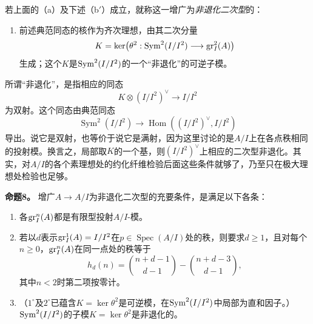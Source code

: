 若上面的（a）及下述（b$'$）成立，就称这一增广为\emph{非退化二次型}的：
\begin{enumerate}
\item[(b$'$)] 前述典范同态的核作为齐次理想，由其二次分量
\[
K=\ker\bigl(\theta^2:\operatorname{Sym}^2(I/I^2)\longrightarrow\operatorname{gr}_I^2(A)\bigr)
\]
生成；这个$K$是$\operatorname{Sym}^2(I/I^2)$的一个“非退化”的可逆子模。
\end{enumerate}
所谓“非退化”，是指相应的同态
\[
K\otimes (I/I^2)^\vee\longrightarrow I/I^2
\]
为双射。这个同态由典范同态
\[
\operatorname{Sym}^2(I/I^2)\longrightarrow
\operatorname{Hom}((I/I^2)^\vee,I/I^2)
\]
导出。说它是双射，也等价于说它是满射，因为这里讨论的是$A/I$上在各点秩相同的投射模。换言之，局部取$K$的一个基，则$(I/I^2)^\vee$上相应的二次型非退化。其实，对$A/I$的各个素理想处的约化纤维检验后面这些条件就够了，乃至只在极大理想处检验也足够。

\noindent\textbf{命题8。}
增广$A\to A/I$为非退化二次型的充要条件，是满足以下各条：
\begin{enumerate}
\item[$1^\circ$] 各$\operatorname{gr}_I^n(A)$都是有限型投射$A/I$-模。
\item[$2^\circ$] 若以$d$表示$\operatorname{gr}_I^1(A)=I/I^2$在$p\in\operatorname{Spec}(A/I)$处的秩，则要求$d\ge1$，且对每个$n\ge0$，$\operatorname{gr}_I^n(A)$在同一点处的秩等于
\[
h_d(n)=\binom{n+d-1}{d-1}-\binom{n+d-3}{d-1},
\]
其中$n<2$时第二项按零计。
\item[$3^\circ$] （$1^\circ$及$2^\circ$已蕴含$K=\ker\theta^2$是可逆模，在$\operatorname{Sym}^2(I/I^2)$中局部为直和因子。）$\operatorname{Sym}^2(I/I^2)$的子模$K=\ker\theta^2$是非退化的。
\end{enumerate}

